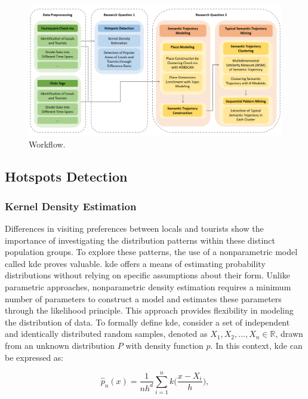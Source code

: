 \documentclass{article}
\begin{document}
\begin{figure}[h!]
\centering
\includegraphics[width=1\textwidth]{figures/workflow.png}
\caption{\label{fig:workflow}Workflow.}
\end{figure}


\subsection{Hotspots Detection}\label{hotspots_detection}

\subsubsection{Kernel Density Estimation}
Differences in visiting preferences between locals and tourists show the importance of investigating the distribution patterns within these distinct population groups. To explore these patterns, the use of a nonparametric model called \acrfull{kde} proves valuable. \acrshort{kde} offers a means of estimating probability distributions without relying on specific assumptions about their form. Unlike parametric approaches, nonparametric density estimation requires a minimum number of parameters to construct a model and estimates these parameters through the likelihood principle. This approach provides flexibility in modeling the distribution of data. To formally define \acrshort{kde}, consider a set of independent and identically distributed random samples, denoted as $X_{1},X_{2},...,X_{n} \in \mathbb{R}$, drawn from an unknown distribution $P$ with density function $p$. In this context, \acrshort{kde} can be expressed as:

\begin{equation} \label{eq:kde}
\hat{p}_{n}(x) = \frac{1}{nh^{d}} \sum_{i=1}^n k\bigg(\frac{x-X_i}{h}\bigg),
\end{equation}
\end{document}
